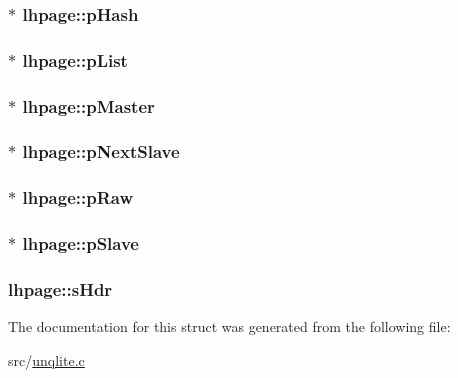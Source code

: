 \hypertarget{structlhpage_a134aee2e60ef3292abc62cf062c09657}{
\subsubsection[{p\-Hash}]{$\ast$ lhpage\-::p\-Hash}}\label{db/d20/structlhpage_a134aee2e60ef3292abc62cf062c09657}
\hypertarget{structlhpage_ad60818704d38fff3f173aa87fdc62bac}{
\subsubsection[{p\-List}]{$\ast$ lhpage\-::p\-List}}\label{db/d20/structlhpage_ad60818704d38fff3f173aa87fdc62bac}
\hypertarget{structlhpage_a87760139e3461c57df83d833c1df7307}{
\subsubsection[{p\-Master}]{$\ast$ lhpage\-::p\-Master}}\label{db/d20/structlhpage_a87760139e3461c57df83d833c1df7307}
\hypertarget{structlhpage_aa20e9c062a95f07b778cde2ba11d30c8}{
\subsubsection[{p\-Next\-Slave}]{$\ast$ lhpage\-::p\-Next\-Slave}}\label{db/d20/structlhpage_aa20e9c062a95f07b778cde2ba11d30c8}
\hypertarget{structlhpage_adc2cb05ad6ba83e723a53c542af2423f}{
\subsubsection[{p\-Raw}]{$\ast$ lhpage\-::p\-Raw}}\label{db/d20/structlhpage_adc2cb05ad6ba83e723a53c542af2423f}
\hypertarget{structlhpage_a57cc238949f02875f5695416a6b9f2a6}{
\subsubsection[{p\-Slave}]{$\ast$ lhpage\-::p\-Slave}}\label{db/d20/structlhpage_a57cc238949f02875f5695416a6b9f2a6}
\hypertarget{structlhpage_a1bdfffe434a576484f603c56e20c4545}{
\subsubsection[{s\-Hdr}]{ lhpage\-::s\-Hdr}}\label{db/d20/structlhpage_a1bdfffe434a576484f603c56e20c4545}


The documentation for this struct was generated from the following file\-:\begin{DoxyCompactItemize}
\item 
src/\hyperlink{unqlite_8c}{unqlite.\-c}\end{DoxyCompactItemize}
